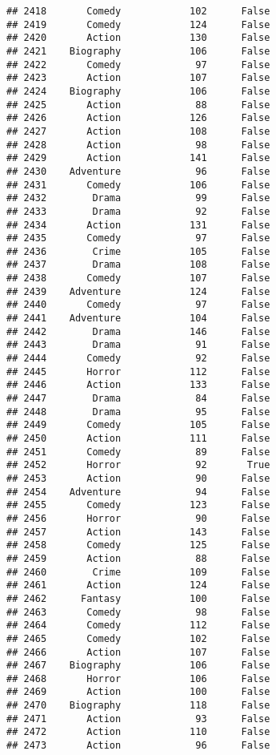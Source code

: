 \documentclass[
]{article}
\begin{document}
\begin{verbatim}
## 2418       Comedy            102      False
## 2419       Comedy            124      False
## 2420       Action            130      False
## 2421    Biography            106      False
## 2422       Comedy             97      False
## 2423       Action            107      False
## 2424    Biography            106      False
## 2425       Action             88      False
## 2426       Action            126      False
## 2427       Action            108      False
## 2428       Action             98      False
## 2429       Action            141      False
## 2430    Adventure             96      False
## 2431       Comedy            106      False
## 2432        Drama             99      False
## 2433        Drama             92      False
## 2434       Action            131      False
## 2435       Comedy             97      False
## 2436        Crime            105      False
## 2437        Drama            108      False
## 2438       Comedy            107      False
## 2439    Adventure            124      False
## 2440       Comedy             97      False
## 2441    Adventure            104      False
## 2442        Drama            146      False
## 2443        Drama             91      False
## 2444       Comedy             92      False
## 2445       Horror            112      False
## 2446       Action            133      False
## 2447        Drama             84      False
## 2448        Drama             95      False
## 2449       Comedy            105      False
## 2450       Action            111      False
## 2451       Comedy             89      False
## 2452       Horror             92       True
## 2453       Action             90      False
## 2454    Adventure             94      False
## 2455       Comedy            123      False
## 2456       Horror             90      False
## 2457       Action            143      False
## 2458       Comedy            125      False
## 2459       Action             88      False
## 2460        Crime            109      False
## 2461       Action            124      False
## 2462      Fantasy            100      False
## 2463       Comedy             98      False
## 2464       Comedy            112      False
## 2465       Comedy            102      False
## 2466       Action            107      False
## 2467    Biography            106      False
## 2468       Horror            106      False
## 2469       Action            100      False
## 2470    Biography            118      False
## 2471       Action             93      False
## 2472       Action            110      False
## 2473       Action             96      False

\end{verbatim}
\end{document}
